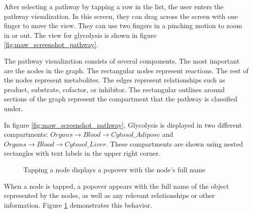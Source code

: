 After selecting a pathway by tapping a row in the list, the user enters the
pathway visualization. In this screen, they can drag across the screen with one
finger to move the view. They can use two fingers in a pinching motion to zoom
in or out. The view for glycolysis is shown in figure
\ref{fig:maw_screenshot_pathway}.

The pathway visualization consists of several components. The most important are
the nodes in the graph. The rectangular nodes represent reactions. The rest of
the nodes represent metabolites. The edges represent relationships such as
product, substrate, cofactor, or inhibitor. The rectangular outlines around
sections of the graph represent the compartment that the pathway is classified
under.

In figure \ref{fig:maw_screenshot_pathway}, Glycolysis is displayed in two
different compartments: $Organs \rightarrow Blood \rightarrow Cytosol\_Adipose$
and $Organs \rightarrow Blood \rightarrow Cytosol\_Liver$. These compartments
are shown using nested rectangles with text labels in the upper right corner.

\begin{figure}[hbtp]
    \caption{\label{fig:maw_screenshot_popover} Tapping a node displays a
    popover with the node's full name}
\end{figure}

When a node is tapped, a popover appears with the full name of the object
represented by the nodes, as well as any relevant relationships or other
information. Figure \ref{fig:maw_screenshot_popover} demonstrates this behavior.

